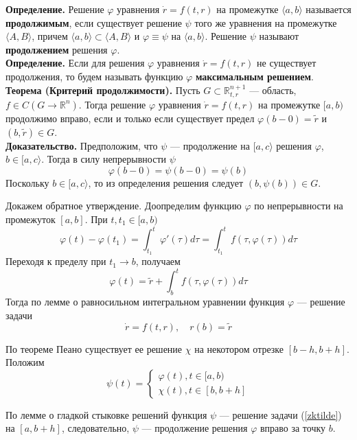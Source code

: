 \textbf{Определение.} Решение $\varphi$ уравнения $\dot{r} = f(t,r)$ на промежутке $\langle a,b \rangle$ называется \textbf{продолжимым}, если существует решение $\psi$ того же уравнения на промежутке $\langle A, B \rangle$, причем $\langle a,b \rangle \subset \langle A,B \rangle$ и $\varphi \equiv \psi$ на $\langle a,b \rangle$. Решение $\psi$ называют \textbf{продолжением} решения $\varphi$.\\

\noindent \textbf{Определение.} Если для решения $\varphi$ уравнения $\dot{r} = f(t,r)$ не существует продолжения, то будем называть функцию $\varphi$ \textbf{максимальным решением}.\\

\noindent \textbf{Теорема (Критерий продолжимости).} Пусть $G \subset \mathbb{R}_{t,r}^{n+1}$ --- область, $f \in C(G \to \mathbb{R}^{n})$. Тогда решение $\varphi$ уравнения $\dot{r} = f(t,r)$ на промежутке $[a,b)$ продолжимо вправо, если и только если существует предел $\varphi(b - 0) = \widetilde{r}$ и $(b, \widetilde{r}) \in G$.\\

\noindent \textbf{Доказательство.} Предположим, что $\psi$ --- продолжение на $[a,c\rangle$ решения $\varphi$, $b \in [a,c\rangle$. Тогда в силу непрерывности $\psi$
\begin{equation*}
    \varphi(b-0) = \psi(b-0) = \psi(b)
\end{equation*}
Поскольку $b \in [a,c\rangle$, то из определения решения следует $(b, \psi(b)) \in G$.

Докажем обратное утверждение. Доопределим функцию $\varphi$ по непрерывности на промежуток $[a,b]$. При $t,t_1 \in [a,b)$
\begin{equation*}
    \varphi(t) - \varphi(t_1) = \int_{t_1}^t \varphi'(\tau)d\tau = \int_{t_1}^t f(\tau, \varphi(\tau))d\tau
\end{equation*}
Переходя к пределу при $t_1 \to b$, получаем
\begin{equation*}
    \varphi(t) = \widetilde{r} + \int_{b}^t f(\tau, \varphi(\tau))d\tau
\end{equation*}
Тогда по лемме о равносильном интегральном уравнении функция $\varphi$ --- решение задачи
\begin{equation}
    \dot{r} = f(t,r), \quad r(b) = \widetilde{r} \label{zktilde}
\end{equation}

По теореме Пеано существует ее решение $\chi$ на некотором отрезке $[b-h, b+h]$. Положим
\begin{equation*}
    \psi(t) = \begin{cases}
    \varphi(t), t \in [a,b)\\
    \chi(t), t \in [b, b + h]
    \end{cases}
\end{equation*}

По лемме о гладкой стыковке решений функция $\psi$ --- решение задачи (\ref{zktilde}) на $[a,b+h]$, следовательно, $\psi$ --- продолжение решения $\varphi$ вправо за точку $b$.
